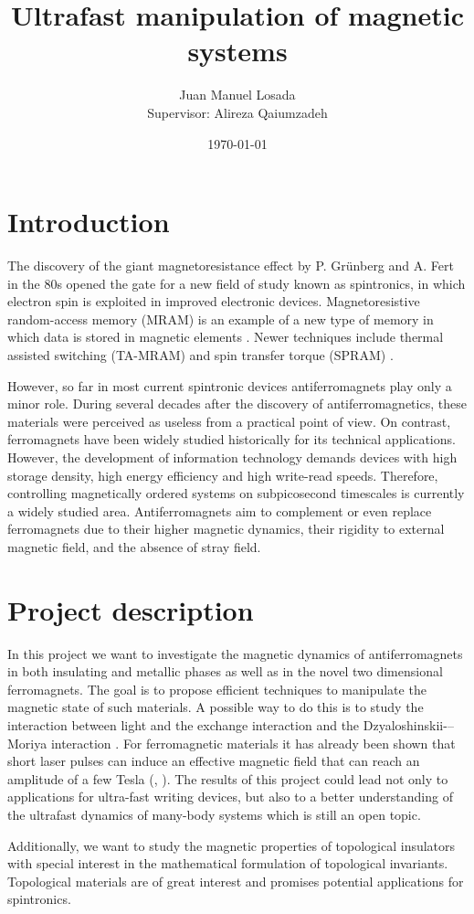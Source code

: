 \documentclass{article}
\title{Ultrafast manipulation of magnetic systems}
\author{Juan Manuel Losada\\[1cm]{\small Supervisor: Alireza Qaiumzadeh}}
\date{\today}
\begin{document}
\maketitle %

\section{Introduction} %

The discovery of the giant magnetoresistance effect by P. Grünberg \cite{Binasch1989} and A. Fert \cite{Baibich1988} in the 80s opened the gate for a new field of study known as spintronics, in which electron spin is exploited in improved electronic devices. Magnetoresistive random-access memory (MRAM) is an example of a new type of memory in which data is stored in magnetic elements \citep{Akerman2005}. Newer techniques include thermal assisted switching (TA-MRAM) \citep{Bandiera2015} and spin transfer torque (SPRAM) \citep{Kawahara2012}.

However, so far in most current spintronic devices antiferromagnets play only a minor role. During several decades after the discovery of antiferromagnetics, these materials were perceived as useless from a practical point of view. On contrast, ferromagnets have been widely studied historically for its technical applications. However, the development of information technology demands devices with high storage density, high energy efficiency and high write-read speeds. Therefore, controlling magnetically ordered systems on subpicosecond timescales is currently a widely studied area. Antiferromagnets aim to complement or even replace ferromagnets due to their higher magnetic dynamics, their rigidity to external magnetic field, and the absence  of stray field.

\section{Project description}

In this project we want to investigate the magnetic dynamics of antiferromagnets in both insulating and metallic phases as well as in the novel two dimensional ferromagnets. The goal is to propose efficient techniques to manipulate the magnetic state of such materials. A possible way to do this is to study the interaction between light and the exchange interaction and the Dzyaloshinskii-–Moriya interaction \cite{Mentink2015}. For ferromagnetic materials it has already been shown that short laser pulses can induce an effective magnetic field that can reach an amplitude of a few Tesla (\cite{Qaiumzadeh2016}, \cite{Qaiumzadeh2013}). The results of this project could lead not only to applications for ultra-fast writing devices, but also to a better understanding of the ultrafast dynamics of many-body systems which is still an open topic. 

Additionally, we want to study the magnetic properties of topological insulators with special interest in the mathematical formulation of topological invariants. Topological materials are of great interest and promises potential applications for spintronics.

\printbibliography 
\end{document}
